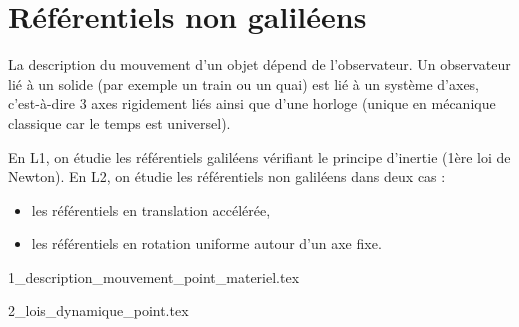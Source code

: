 \chapter{Référentiels non galiléens}

La description du mouvement d'un objet dépend de l'observateur. Un observateur lié à un solide (par exemple un train ou un quai) est lié à un système d'axes, c'est-à-dire 3 axes rigidement liés ainsi que d'une horloge (unique en mécanique classique car le temps est universel).

En L1, on étudie les référentiels galiléens vérifiant le principe d'inertie (1ère loi de Newton). En L2, on étudie les référentiels non galiléens dans deux cas :
\begin{itemize}
    \item les référentiels en translation accélérée,
    \item les référentiels en rotation uniforme autour d'un axe fixe.
\end{itemize}

\minitoc 

{1_description_mouvement_point_materiel.tex}

{2_lois_dynamique_point.tex}